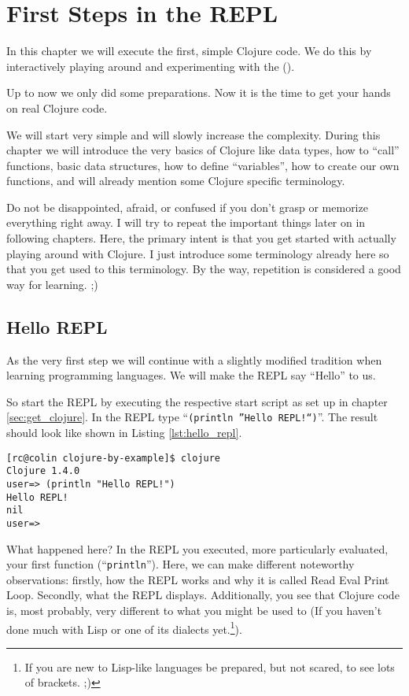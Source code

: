 \chapter{First Steps in the REPL}
\label{sec:first_repl_steps}
In this chapter we will execute the first, simple Clojure code.
We do this by interactively playing around and experimenting with the  ().

Up to now we only did some preparations.
Now it is the time to get your hands on real Clojure code.

We will start very simple and will slowly increase the complexity.
During this chapter we will introduce the very basics of Clojure like data types, how to ``call'' functions,
basic data structures, how to define ``variables'', how to create our own functions, and will already mention some Clojure specific terminology.

Do not be disappointed, afraid, or confused if you don't grasp or memorize everything right away.
I will try to repeat the important things later on in following chapters.
Here, the primary intent is that you get started with actually playing around with Clojure.
I just introduce some terminology already here so that you get used to this terminology.
By the way, repetition is considered a good way for learning. ;)

\section{Hello  REPL}
As the very first step we will continue with a slightly modified tradition when learning programming languages.
We will make the REPL say ``Hello'' to us.

So start the REPL by executing the respective start script as set up in chapter \vref{sec:get_clojure}.
In the REPL type ``\texttt{(println ''Hello REPL!``)}''.
The result should look like shown in Listing \vref{lst:hello_repl}.

\begin{lstlisting}[label=lst:hello_repl, caption=Say ``Hello'' REPL! -- ``Hello REPL!'']
[rc@colin clojure-by-example]$ clojure 
Clojure 1.4.0
user=> (println "Hello REPL!")
Hello REPL!
nil
user=> 
\end{lstlisting}

What happened here?
In the REPL you executed, more particularly evaluated, your first function (``\texttt{println}'').
Here, we can make different noteworthy observations:
firstly, how the REPL works and why it is called Read Eval Print Loop.
Secondly, what the REPL displays.
Additionally, you see that Clojure code is, most probably, very different to what you might be used to 
(If you haven't done much with Lisp or one of its dialects yet.\footnote{If you are new to Lisp-like languages be prepared, but not scared, to see lots of brackets. ;)}).

